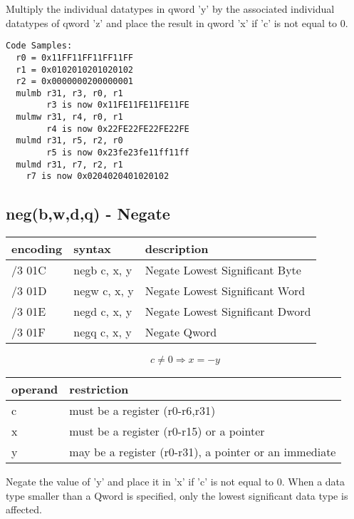 \documentclass[letterpaper,10pt,openright,twoside,onecolumn]{book}
\begin{document}
  Multiply the individual datatypes in qword 'y' by the associated
  individual datatypes of qword 'z' and place the result in qword 'x'
  if 'c' is not equal to 0.

  \begin{verbatim}
Code Samples:
  r0 = 0x11FF11FF11FF11FF
  r1 = 0x0102010201020102
  r2 = 0x0000000200000001
  mulmb r31, r3, r0, r1
        r3 is now 0x11FE11FE11FE11FE
  mulmw r31, r4, r0, r1
        r4 is now 0x22FE22FE22FE22FE
  mulmd r31, r5, r2, r0
        r5 is now 0x23fe23fe11ff11ff
  mulmd r31, r7, r2, r1
	r7 is now 0x0204020401020102
  \end{verbatim}
\newpage\subsection{neg(b,w,d,q) - Negate}
  \begin{tabular}{|l|l|l|}
   \hline
    encoding & syntax & description \\
   \hline
    /3 01C & negb c, x, y & Negate Lowest Significant Byte \\
    /3 01D & negw c, x, y & Negate Lowest Significant Word \\
    /3 01E & negd c, x, y & Negate Lowest Significant Dword \\
    /3 01F & negq c, x, y & Negate Qword \\
   \hline
  \end{tabular}

  \begin{displaymath} c \neq 0 \Rightarrow x = -y\end{displaymath}

  \flushleft
  \begin{tabular}{|l|l|}
   \hline
    operand & restriction \\
   \hline
    c & must be a register (r0-r6,r31) \\
    x & must be a register (r0-r15) or a pointer \\
    y & may be a register (r0-r31), a pointer or an immediate \\
   \hline
  \end{tabular}

  Negate the value of 'y' and place it in 'x' if 'c' is not equal
  to 0.
  When a data type smaller than a Qword is specified, only the
  lowest significant data type is affected.
\end{document}
